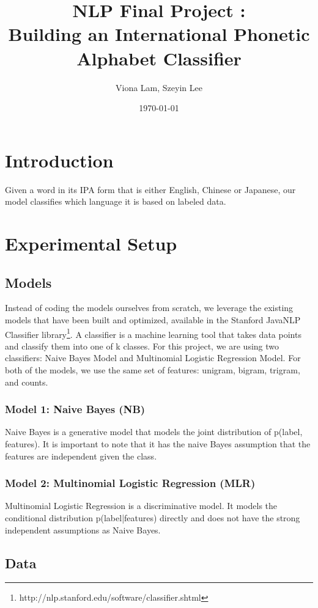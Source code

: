\documentclass[a4paper]{article}
\title{NLP Final Project : \\
Building an International Phonetic Alphabet Classifier}
\author{Viona Lam, Szeyin Lee}
\date{\today}
\begin{document}
\maketitle


\section{Introduction}
Given a word in its IPA form that is either English, Chinese or Japanese, our model classifies which language it is based on labeled data.

\section{Experimental Setup}

\subsection{Models}

Instead of coding the models ourselves from scratch, we leverage the existing models that have been built and optimized, available in the Stanford JavaNLP Classifier library\footnote{http://nlp.stanford.edu/software/classifier.shtml}. A classifier is a machine learning tool that takes data points and classify them into one of k classes. For this project, we are using two classifiers: Naive Bayes Model and Multinomial Logistic Regression Model. For both of the models, we use the same set of features: unigram, bigram, trigram, and counts. 

\subsubsection{Model 1: Naive Bayes (NB)}

Naive Bayes is a generative model that models the joint distribution of p(label, features). It is important to note that it has the naive Bayes assumption that the features are independent given the class.

\subsubsection{Model 2: Multinomial Logistic Regression (MLR)}
Multinomial Logistic Regression is a discriminative model. It models the
conditional distribution p(label|features) directly and does not have the strong independent assumptions as Naive Bayes.

\subsection{Data}
\end{document}
